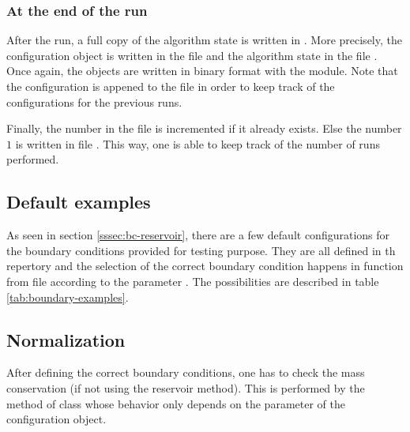         \subsubsection{At the end of the run}
        \noindent

            After the run, a full copy of the algorithm state is written in . More precisely,
            the configuration object is written in the file  and the algorithm state in
            the file . Once again, the objects are written in binary format with the
            \cpck{} module. Note that the configuration is appened to the file in order to keep track
            of the configurations for the previous runs.

            Finally, the number in the file  is incremented if it already exists. Else
            the number $1$ is written in file . This way, one is able to keep track of
            the number of runs performed.

    \subsection{Default examples\label{sssec:examples}}
    \noindent

        As seen in section \ref{sssec:bc-reservoir}, there are a few default configurations for the boundary conditions
        provided for testing purpose. They are all defined in th repertory  and the
        selection of the correct boundary condition happens in function  from file
         according to the parameter . The possibilities are described in
        table \ref{tab:boundary-examples}.

        

    \subsection{Normalization\label{sssec:normalization}}
    \noindent

        After defining the correct boundary conditions, one has to check the mass conservation (if not using the reservoir method).
        This is performed by the  method of class  whose behavior only depends on
        the  parameter of the configuration object.

